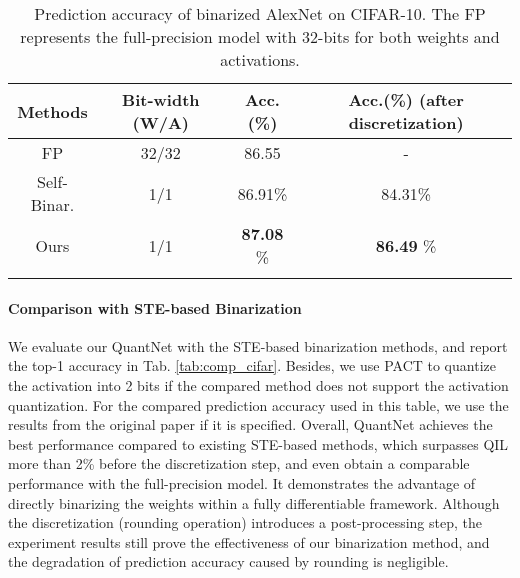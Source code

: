 \documentclass[runningheads]{llncs}
\begin{document}
\begin{table}[htb]
\begin{center}
   \centering
   \begin{tabular}{cccc}
   \hline
    Methods                       & Bit-width (W/A)   & Acc.(\%)             & Acc.(\%) (after discretization) \\
   \hline
    FP                                    & 32/32     &  86.55               & - \\
    Self-Binar. \cite{lahoud2019self}     & 1/1       &  86.91\%             & 84.31\%  \\
    Ours                                  & 1/1       &  \textbf{87.08} \%   & \textbf{86.49} \%    \\
    \hline
    \noalign{\smallskip}
    \noalign{\smallskip}
    \end{tabular}
    \caption{Prediction accuracy of binarized AlexNet on CIFAR-10. The FP represents the full-precision model with 32-bits for both weights and activations.}
    \label{tab:perf_drop}
\end{center}
\end{table}

\paragraph{\textbf{Comparison with STE-based Binarization}}
We evaluate our QuantNet with the STE-based binarization methods,
and report the top-1 accuracy in Tab. \ref{tab:comp_cifar}.
Besides, we use PACT \cite{pact2018} to quantize the activation into 2 bits
if the compared method does not support the activation quantization.
For the compared prediction accuracy used in this table,
we use the results from the original paper if it is specified.
Overall, QuantNet achieves the best performance compared to existing STE-based methods,
which surpasses QIL \cite{jung2019learning} more than 2\% before the discretization step,
and even obtain a comparable performance with the full-precision model.
It demonstrates the advantage of directly binarizing the weights within a fully differentiable framework.
Although the discretization (rounding operation) introduces a post-processing step,
the experiment results still prove the effectiveness of our binarization method,
and the degradation of prediction accuracy caused by rounding is negligible.
\end{document}
